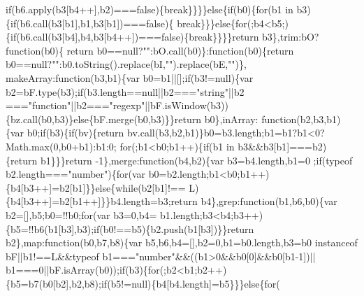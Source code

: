 \begin{DoxyCode}
{      if}(b6.apply(b3[b4++],b2)===\textcolor{keyword}{false})\{\textcolor{keywordflow}{break}\}\}\}\}\textcolor{keywordflow}{else}\{\textcolor{keywordflow}{if}(b0)\{\textcolor{keywordflow}{for}(b1 in b3)\{\textcolor{keywordflow}{if}(b6.call(b3[b1],b1,b3[b1])===\textcolor{keyword}{false})\{\textcolor{keywordflow}{
      break}\}\}\}\textcolor{keywordflow}{else}\{\textcolor{keywordflow}{for}(;b4<b5;)\{\textcolor{keywordflow}{if}(b6.call(b3[b4],b4,b3[b4++])===\textcolor{keyword}{false})\{\textcolor{keywordflow}{break}\}\}\}\}\textcolor{keywordflow}{return} b3\},trim:bO?\textcolor{keyword}{function}(b0)\{\textcolor{keywordflow}{
      return} b0==null?\textcolor{stringliteral}{""}:bO.call(b0)\}:\textcolor{keyword}{function}(b0)\{\textcolor{keywordflow}{return} b0==null?\textcolor{stringliteral}{""}:b0.toString().replace(bI,\textcolor{stringliteral}{""}).replace(bE,\textcolor{stringliteral}{""})\},
      makeArray:\textcolor{keyword}{function}(b3,b1)\{var b0=b1||[];\textcolor{keywordflow}{if}(b3!=null)\{var b2=bF.type(b3);\textcolor{keywordflow}{if}(b3.length==null||b2===\textcolor{stringliteral}{"string"}||b2
      ===\textcolor{stringliteral}{"function"}||b2===\textcolor{stringliteral}{"regexp"}||bF.isWindow(b3))\{bz.call(b0,b3)\}\textcolor{keywordflow}{else}\{bF.merge(b0,b3)\}\}\textcolor{keywordflow}{return} b0\},inArray:\textcolor{keyword}{
      function}(b2,b3,b1)\{var b0;\textcolor{keywordflow}{if}(b3)\{\textcolor{keywordflow}{if}(bv)\{\textcolor{keywordflow}{return} bv.call(b3,b2,b1)\}b0=b3.length;b1=b1?b1<0?Math.max(0,b0+b1):b1:0;\textcolor{keywordflow}{
      for}(;b1<b0;b1++)\{\textcolor{keywordflow}{if}(b1 in b3&&b3[b1]===b2)\{\textcolor{keywordflow}{return} b1\}\}\}\textcolor{keywordflow}{return} -1\},merge:\textcolor{keyword}{function}(b4,b2)\{var b3=b4.length,b1=0
      ;\textcolor{keywordflow}{if}(typeof b2.length===\textcolor{stringliteral}{"number"})\{\textcolor{keywordflow}{for}(var b0=b2.length;b1<b0;b1++)\{b4[b3++]=b2[b1]\}\}\textcolor{keywordflow}{else}\{\textcolor{keywordflow}{while}(b2[b1]!==
      L)\{b4[b3++]=b2[b1++]\}\}b4.length=b3;\textcolor{keywordflow}{return} b4\},grep:\textcolor{keyword}{function}(b1,b6,b0)\{var b2=[],b5;b0=!!b0;\textcolor{keywordflow}{for}(var b3=0,b4=
      b1.length;b3<b4;b3++)\{b5=!!b6(b1[b3],b3);\textcolor{keywordflow}{if}(b0!==b5)\{b2.push(b1[b3])\}\}\textcolor{keywordflow}{return} b2\},map:\textcolor{keyword}{function}(b0,b7,b8)\{var 
      b5,b6,b4=[],b2=0,b1=b0.length,b3=b0 instanceof bF||b1!==L&&typeof b1===\textcolor{stringliteral}{"number"}&&((b1>0&&b0[0]&&b0[b1-1])||
      b1===0||bF.isArray(b0));\textcolor{keywordflow}{if}(b3)\{\textcolor{keywordflow}{for}(;b2<b1;b2++)\{b5=b7(b0[b2],b2,b8);\textcolor{keywordflow}{if}(b5!=null)\{b4[b4.length]=b5\}\}\}\textcolor{keywordflow}{else}\{\textcolor{keywordflow}{for}(

\end{DoxyCode}
